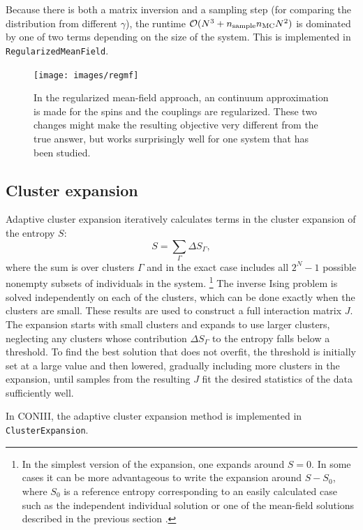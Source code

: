 \documentclass[aps,prl,twocolumn]{revtex4-1}
\begin{document}
Because there is both a matrix inversion and a sampling step (for comparing the distribution from different $\gamma$), the runtime $\mathcal{O}(N^3 + n_{\rm sample}n_{\rm MC}N^2)$ is dominated by one of two terms depending on the size of the system.
This is implemented in {\tt RegularizedMeanField}.

\begin{figure}[tb]\centering
	\texttt{[image: images/regmf]}
\caption{In the regularized mean-field approach, an continuum approximation is made for the spins and the couplings are regularized. These two changes might make the resulting objective very different from the true answer, but works surprisingly well for one system that has been studied.}
\label{gr:regmf}
\end{figure}



\subsection{Cluster expansion}
Adaptive cluster expansion \cite{CocMon11,CocMon12,BarCoc13}
iteratively calculates terms in the
cluster expansion of the entropy $S$:
\begin{equation}
S = \sum_\Gamma \Delta S_\Gamma,
\end{equation}
where the sum is over clusters $\Gamma$ and in the exact case
includes all $2^N - 1$ possible nonempty subsets of individuals in the system.
\footnote{In the simplest version of the expansion,
one expands around $S=0$.  In some cases it can be more advantageous to write the
expansion around $S-S_0$, where $S_0$ is a reference entropy corresponding to
an easily calculated case such as
the independent individual solution or one of the mean-field solutions
described in the previous section \cite{BarCoc13}.}
The inverse Ising problem is solved independently
on each of the clusters, which can be done exactly when the
clusters are small.  These results are used to construct a full
interaction matrix $J$.
The expansion starts with small clusters and expands to use larger
clusters, neglecting any clusters whose
contribution $\Delta S_\Gamma$ to the entropy falls below a threshold.
To find the best solution that does not overfit,
the threshold is initially set at a large value and then lowered,
gradually including more clusters in the expansion, until samples from
the resulting $J$ fit the desired statistics of the data sufficiently well.

In CONIII, the adaptive cluster expansion method is implemented in {\tt ClusterExpansion}.
\end{document}

